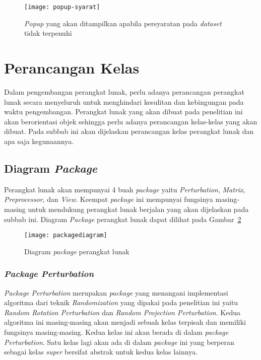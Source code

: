 \begin{figure}
	\centering
	\texttt{[image: popup-syarat]}
	\caption{\textit{Popup} yang akan ditampilkan apabila persyaratan pada \textit{dataset} tidak terpenuhi}
	\label{fig:popup-syarat}
\end{figure}

\section{Perancangan Kelas}
\label{sec:kelas}

Dalam pengembangan perangkat lunak, perlu adanya perancangan perangkat lunak secara menyeluruh untuk menghindari kesulitan dan kebingungan pada waktu pengembangan. Perangkat lunak yang akan dibuat pada penelitian ini akan berorientasi objek sehingga perlu adanya perancangan kelas-kelas yang akan dibuat. Pada subbab ini akan dijelaskan perancangan kelas perangkat lunak dan apa saja kegunaannya.

\subsection{Diagram \textit{Package}}
\label{subsec:diagram-package}

Perangkat lunak akan mempunyai 4 buah \textit{package} yaitu \textit{Perturbation}, \textit{Matrix}, \textit{Preprocessor}, dan \textit{View}. Keempat \textit{package} ini mempunyai fungsinya masing-masing untuk mendukung perangkat lunak berjalan yang akan dijelaskan pada subbab ini. Diagram \textit{Package} perangkat lunak dapat dilihat pada Gambar~\ref{fig:packagediagram}

\begin{figure}
	\centering
	\texttt{[image: packagediagram]}
	\caption{Diagram \textit{package} perangkat lunak}
	\label{fig:packagediagram}
\end{figure}

\subsubsection{\textit{Package Perturbation}}
\label{subsubsec:package-perturbation}

\textit{Package Perturbation} merupakan \textit{package} yang menangani implementasi algoritma dari teknik \textit{Randomization} yang dipakai pada penelitian ini yaitu \textit{Random Rotation Perturbation} dan \textit{Random Projection Perturbation}. Kedua algoritma ini masing-masing akan menjadi sebuah kelas terpisah dan memiliki fungsinya masing-masing. Kedua kelas ini akan berada di dalam \textit{package Perturbation}. Satu kelas lagi akan ada di dalam \textit{package} ini yang berperan sebagai kelas \textit{super} bersifat abstrak untuk kedua kelas lainnya.

